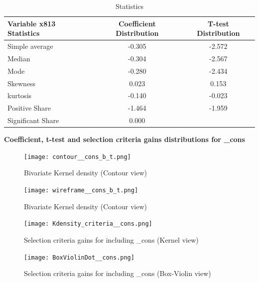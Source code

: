 \documentclass{article}
\begin{document}
\begin{table}[!h]
    \centering
    \caption{Statistics}
    \begin{tabular}{|l|c|c|}
    \hline
    Variable x813 Statistics &  Coefficient Distribution &  T-test Distribution  \\
    \hline
    \hline
    Simple average    & -0.305      & -2.572 \\
    \hline
    Median            & -0.304   & -2.567 \\
    \hline
    Mode              & -0.280     & -2.434 \\
    \hline
    Skewness          & 0.023      & 0.153 \\
    \hline
    kurtosis          & -0.140     & -0.023 \\
    \hline
    Positive Share    & -1.464     & -1.959 \\
    \hline
    Significant Share & 0.000 &  \\
    \hline
    \end{tabular}
\end{table}

\clearpage
\begin{center}
    \large{\textbf{Coefficient, t-test and selection criteria gains distributions for _cons }}
\end{center}

\vspace{-5mm}

\begin{figure}[!ht]
  \centering
  \begin{minipage}[b]{0.46\textwidth}
    \centering
    \texttt{[image: contour\_\_cons\_b\_t.png]}
    \caption{Bivariate Kernel density (Contour view)}
  \end{minipage}
  \hfill
  \begin{minipage}[b]{0.53\textwidth}
    \centering
    \texttt{[image: wireframe\_\_cons\_b\_t.png]}
    \caption{Bivariate Kernel density (Contour view)}
  \end{minipage}

  \begin{minipage}[b]{0.48\textwidth}
    \centering
    \texttt{[image: Kdensity\_criteria\_\_cons.png]}
    \caption{Selection criteria gains for including _cons (Kernel view)}
  \end{minipage}
  \hfill
  \begin{minipage}[b]{0.48\textwidth}
    \centering    
    \texttt{[image: BoxViolinDot\_\_cons.png]}
    \caption{Selection criteria gains for including _cons (Box-Violin view)}    
  \end{minipage}
\end{figure}
\end{document}
